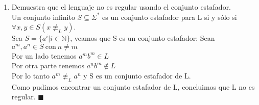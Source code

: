\documentclass{article}
\begin{document}
\begin{enumerate}
{\begin{enumerate}
{        	\[u = a^k, \ v= a^j, \  k \geq 0, j \geq 1 , k+j=s\]
        	Pues $v \neq \epsilon$. Y como $w = a^nb^n$, tenemos que $x = a^{n-k-j}b^n$\\
        	
			Si tomamos $m = 4$, por el lema del bombeo, se debe cumplir que 
			$uv^4x \in L$.\\
        	
			Pero tenemos que $uv^4x = a^ka^ja^ja^ja^ja^{n-k-j}b^n = a^{n+3j}b^n$,
			que estaría el $L$ únicamente cuando $j=0$, pero $j \geq 1$. Entonces
			esta cadena no está el $L$, que es una contradicción al lema del 
			bombeo.\\
        	
        	Por lo tanto, L no es un lenguaje regular $\blacksquare$
        	}\\
        
        	\item{
        	Demuestra que el lenguaje no es regular usando el conjunto estafador.\\
        	
        	Un conjunto infinito $S \subseteq \Sigma^*$ es un conjunto estafador para L si y sólo si $\forall x,y \in S (x \not\equiv_L y)$.\\
        	
        	Sea $S = \{ a^i | i \in \mathbb{N}\}$, veamos que S es un conjunto estafador: Sean $a^m , a^n \in S \ \text{con} \ n \neq m$\\
        	
        	Por un lado tenemos $ a^mb^m \in L$\\
        	Por otra parte tenemos $a^nb^m \not \in L$\\
        	
        	Por lo tanto $a^m \not\equiv_L a^n$ y S es un conjunto estafador de L.\\
        	
        	Como pudimos encontrar un conjunto estafador de L, concluimos que L no es regular. $\blacksquare$
        	}
        \end{enumerate}
    	}
    \end{enumerate}
\end{document}
